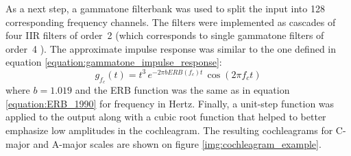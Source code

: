 As a next step, a gammatone filterbank was used to split the input into 128 corresponding frequency channels. The filters were implemented as cascades of four IIR filters of order~2 (which corresponds to single gammatone filters of order~4 \cite{Stimberg2019brian2hears}). The approximate impulse response was similar to the one defined in equation \ref{equation:gammatone_impulse_response}:
\begin{equation}
	g_{f_c}(t) = t^3\,e^{-2\pi{}bERB(f_c)t}\,\cos(2\pi{}f_c{}t)
\end{equation}
where $b=1.019$ and the ERB function was the same as in equation \ref{equation:ERB_1990} for frequency in Hertz. Finally, a unit-step function was applied to the output along with a cubic root function that helped to better emphasize low amplitudes in the cochleagram. The resulting cochleagrams for C-major and A-major scales are shown on figure \ref{img:cochleagram_example}.\\

